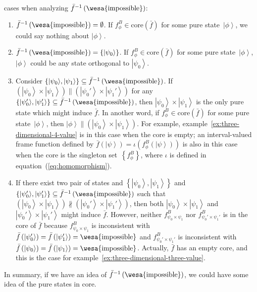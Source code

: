 \documentclass{article}
\theoremstyle{remark}
\newcommand{\imposs}{{\mbox{\wesa{impossible}}}}
\newcommand{\ket}[1]{{\left\vert{#1}\right\rangle}}
\begin{document}
cases when analyzing $\bar{f}^{-1}\left(\imposs\right)$:
\begin{enumerate}
\item $\bar{f}^{-1}\left(\imposs\right)=\emptyset$. If $f_{\phi}^{B}\in\mathrm{core}\left(\bar{f}\right)$
for some pure state~$\ket{\phi}$, we could say nothing about $\ket{\phi}$.
\item $\bar{f}^{-1}\left(\imposs\right)=\left\{ \ket{\psi_{0}}\right\} $.
If $f_{\phi}^{B}\in\mathrm{core}\left(\bar{f}\right)$ for some pure
state~$\ket{\phi}$, $\ket{\phi}$ could be any state orthogonal
to $\ket{\psi_{0}}$.
\item Consider $\left\{ \ket{\psi_{0}},\ket{\psi_{1}}\right\} \subseteq\bar{f}^{-1}\left(\imposs\right)$.
If $\left(\ket{\psi_{0}}\times\ket{\psi_{1}}\right)\parallel\left(\ket{\psi_{0}'}\times\ket{\psi_{1}'}\right)$
for any $\left\{ \ket{\psi_{0}'},\ket{\psi_{1}'}\right\} \subseteq\bar{f}^{-1}\left(\imposs\right)$,
then $\ket{\psi_{0}}\times\ket{\psi_{1}}$ is the only pure state
which might induce $\bar{f}$. In another word, if $f_{\phi}^{B}\in\mathrm{core}\left(\bar{f}\right)$
for some pure state~$\ket{\phi}$, then $\ket{\phi}\parallel\left(\ket{\psi_{0}}\times\ket{\psi_{1}}\right)$.
For example, example~\ref{ex:three-dimensional-4-value} is in this
case when the core is empty; an interval-valued frame function defined
by $\bar{f}\left(\ket{\psi}\right)=\iota\left(f_{\phi}^{B}\left(\ket{\psi}\right)\right)$
is also in this case when the core is the singleton set~$\left\{ f_{\phi}^{B}\right\} $,
where $\iota$ is defined in equation~(\ref{eq:homomorphism}).
\item If there exist two pair of states and $\left\{ \ket{\psi_{0}},\ket{\psi_{1}}\right\} $
and $\left\{ \ket{\psi_{0}'},\ket{\psi_{1}'}\right\} \subseteq\bar{f}^{-1}\left(\imposs\right)$
such that $\left(\ket{\psi_{0}}\times\ket{\psi_{1}}\right)\nparallel\left(\ket{\psi_{0}'}\times\ket{\psi_{1}'}\right)$,
then both $\ket{\psi_{0}}\times\ket{\psi_{1}}$ and $\ket{\psi_{0}'}\times\ket{\psi_{1}'}$
might induce $\bar{f}$. However, neither $f_{\psi_{0}\times\psi_{1}}^{B}$
nor $f_{\psi_{0}'\times\psi_{1}'}^{B}$ is in the core of $\bar{f}$
because $f_{\psi_{0}\times\psi_{1}}^{B}$ is inconsistent with $\bar{f}\left(\ket{\psi_{0}'}\right)=\bar{f}\left(\ket{\psi_{1}'}\right)=\imposs$
and $f_{\psi_{0}'\times\psi_{1}'}^{B}$ is inconsistent with $\bar{f}\left(\ket{\psi_{0}}\right)=\bar{f}\left(\ket{\psi_{1}}\right)=\imposs$.
Actually, $\bar{f}$ has an empty core, and this is the case for example~\ref{ex:three-dimensional-three-value}.
\end{enumerate}
In summary, if we have an idea of $\bar{f}^{-1}\left(\imposs\right)$,
we could have some idea of the pure states in core.
\end{document}

